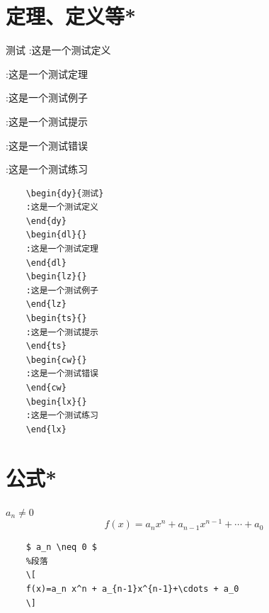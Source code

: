 \documentclass{ctexart}
\begin{document}
\newpage
\section{定理、定义等*}

    \begin{dy}{测试}
    :这是一个测试定义
    \end{dy}
    \begin{dl}{}
    :这是一个测试定理
    \end{dl}
    \begin{lz}{}
    :这是一个测试例子
    \end{lz}
    \begin{ts}{}
    :这是一个测试提示
    \end{ts}
    \begin{cw}{}
    :这是一个测试错误
    \end{cw}
    \begin{lx}{}
    :这是一个测试练习
    \end{lx}
\begin{lstlisting}[language={[LaTeX]TeX}]
    % 在环境内容开始前加一个字符就正常显示，不然会吞掉一个字符
    \begin{dy}{测试}
    :这是一个测试定义
    \end{dy}
    \begin{dl}{}
    :这是一个测试定理
    \end{dl}
    \begin{lz}{}
    :这是一个测试例子
    \end{lz}
    \begin{ts}{}
    :这是一个测试提示
    \end{ts}
    \begin{cw}{}
    :这是一个测试错误
    \end{cw}
    \begin{lx}{}
    :这是一个测试练习
    \end{lx}
\end{lstlisting}
\newpage
\section{公式*}
$ a_n \neq 0 $
\[
f(x)=a_n x^n + a_{n-1}x^{n-1}+\cdots + a_0
\]
\begin{lstlisting}[language={[LaTeX]TeX}]
    %行内
    $ a_n \neq 0 $
    %段落
    \[
    f(x)=a_n x^n + a_{n-1}x^{n-1}+\cdots + a_0
    \]
\end{lstlisting}
\end{document}
